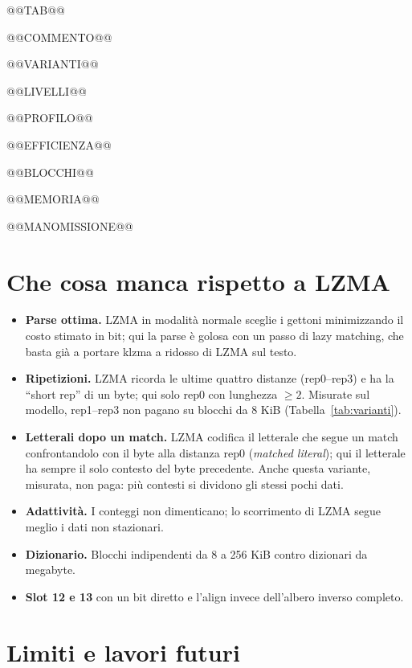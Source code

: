 @@TAB@@

@@COMMENTO@@

@@VARIANTI@@

@@LIVELLI@@

@@PROFILO@@

@@EFFICIENZA@@

@@BLOCCHI@@

@@MEMORIA@@

@@MANOMISSIONE@@

\section{Che cosa manca rispetto a LZMA}

\begin{itemize}
\item \textbf{Parse ottima.} LZMA in modalità normale sceglie i gettoni minimizzando il costo stimato in bit; qui la parse è golosa con un passo di lazy matching, che basta già a portare klzma a ridosso di LZMA sul testo.
\item \textbf{Ripetizioni.} LZMA ricorda le ultime quattro distanze (rep0--rep3) e ha la ``short rep'' di un byte; qui solo rep0 con lunghezza $\ge 2$. Misurate sul modello, rep1--rep3 non pagano su blocchi da 8 KiB (Tabella~\ref{tab:varianti}).
\item \textbf{Letterali dopo un match.} LZMA codifica il letterale che segue un match confrontandolo con il byte alla distanza rep0 (\emph{matched literal}); qui il letterale ha sempre il solo contesto del byte precedente. Anche questa variante, misurata, non paga: più contesti si dividono gli stessi pochi dati.
\item \textbf{Adattività.} I conteggi non dimenticano; lo scorrimento di LZMA segue meglio i dati non stazionari.
\item \textbf{Dizionario.} Blocchi indipendenti da 8 a 256 KiB contro dizionari da megabyte.
\item \textbf{Slot 12 e 13} con un bit diretto e l'align invece dell'albero inverso completo.
\end{itemize}

\section{Limiti e lavori futuri}

